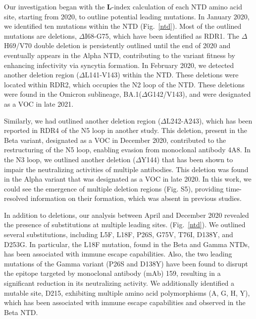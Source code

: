 \documentclass[aps,prl,amsmath,amssymb,floatfix,twocolumn, amsmath, superscriptaddress, onecolumn]{revtex4}
\newcommand{\fref}[1]{Fig.~\ref{#1}}%
\begin{document}
Our investigation began with the $\bm{L}$-index calculation of each NTD amino acid site, starting from 2020, to outline potential leading mutations. In January 2020, we identified ten mutations within the NTD (\fref{ntd}). Most of the outlined mutations are deletions, $\Delta$I68-G75, which have been identified as RDR1.\cite{McCarthy2021} The $\Delta$H69/V70 double deletion is persistently outlined until the end of 2020 and eventually appears in the Alpha NTD, contributing to the variant fitness by enhancing infectivity via syncytia formation.\cite{meng_recurrent_2021} In February 2020, we detected another deletion region ($\Delta$L141-V143) within the NTD. These deletions were located within RDR2, which occupies the N2 loop of the NTD.\cite{McCarthy2021,Chi2020,mccallum_n-terminal_2021} These deletions were found in the Omicron sublineage, BA.1($\Delta$G142/V143), and were designated as a VOC in late 2021.\cite{WHOinfo} 

Similarly, we had outlined another deletion region ($\Delta$L242-A243), which has been reported in RDR4 of the N5 loop in another study.\cite{McCarthy2021} This deletion, present in the Beta variant, designated as a VOC in December 2020, contributed to the restructuring of the N5 loop, enabling evasion from monoclonal antibody 4A8.\cite{Wibmer2021} In the N3 loop, we outlined another deletion ($\Delta$Y144) that has been shown to impair the neutralizing activities of multiple antibodies.\cite{Chi2020,mccallum_n-terminal_2021} This deletion was found in the Alpha variant that was designated as a VOC in late 2020.\cite{WHOinfo} In this work, we could see the emergence of multiple deletion regions (Fig. S5), providing time-resolved information on their formation, which was absent in previous studies.\cite{McCarthy2021}

In addition to deletions, our analysis between April and December 2020 revealed the presence of substitutions at multiple leading sites. (\fref{ntd}). We outlined several substitutions, including L5F, L18F, P26S, G75V, T76I, D138Y, and D253G. In particular, the L18F mutation, found in the Beta and Gamma NTDs, has been associated with immune escape capabilities.\cite{mccallum_n-terminal_2021, Wibmer2021} Also, the two leading mutations of the Gamma variant (P26S and D138Y) have been found to disrupt the epitope targeted by monoclonal antibody (mAb) 159, resulting in a significant reduction in its neutralizing activity.\cite{Dejnirattisai2021} We additionally identified a mutable site, D215, exhibiting multiple amino acid polymorphisms (A, G, H, Y), which has been associated with immune escape capabilities and observed in the Beta NTD.\cite{mccallum_n-terminal_2021, Wibmer2021} 
\end{document}
